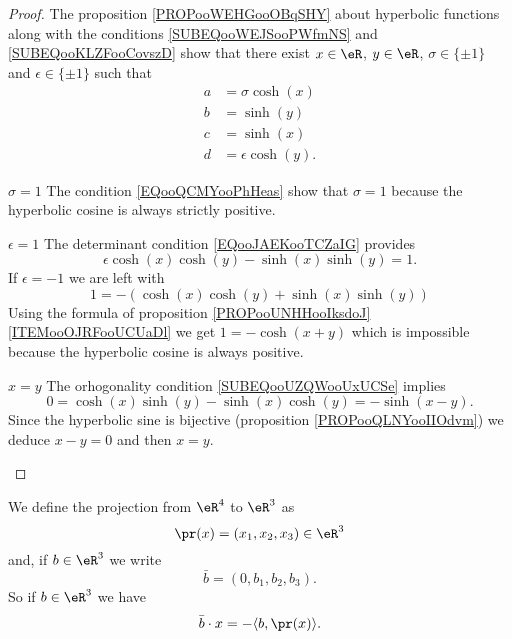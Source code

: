 \begin{proof}
    The proposition \ref{PROPooWEHGooOBqSHY} about hyperbolic functions along with the conditions \eqref{SUBEQooWEJSooPWfmNS} and \ref{SUBEQooKLZFooCovszD} show that there exist \( x\in \eR\), \( y\in \eR\), \( \sigma\in\{ \pm1 \}\) and \( \epsilon\in\{ \pm 1 \}\) such that 
    \begin{subequations}
        \begin{align}
            a&=\sigma\cosh(x)\\
            b&=\sinh(y)\\
            c&=\sinh(x)\\
            d&=\epsilon\cosh(y).
        \end{align}
    \end{subequations}

    \begin{subproof}
        \item[\( \sigma=1\)]
    The condition \eqref{EQooQCMYooPhHeas} show that \( \sigma=1\) because the hyperbolic cosine is always strictly positive.

        \item[\( \epsilon=1\)]
            The determinant condition \eqref{EQooJAEKooTCZaIG} provides
            \begin{equation}
                \epsilon\cosh(x)\cosh(y)-\sinh(x)\sinh(y)=1.
            \end{equation}
            If \( \epsilon=-1\) we are left with
            \begin{equation}
                1=-(\cosh(x)\cosh(y)+\sinh(x)\sinh(y))
            \end{equation}
            Using the formula of proposition \ref{PROPooUNHHooIksdoJ}\ref{ITEMooOJRFooUCUaDl} we get $1=-\cosh(x+y)$ which is impossible because the hyperbolic cosine is always positive.
        \item[\( x=y\)]
            The orhogonality condition \eqref{SUBEQooUZQWooUxUCSe} implies
            \begin{equation}
                0=\cosh(x)\sinh(y)-\sinh(x)\cosh(y)=-\sinh(x-y).
            \end{equation}
            Since the hyperbolic sine is bijective (proposition \ref{PROPooQLNYooIIOdvm}) we deduce \( x-y=0\) and then \( x=y\).
    \end{subproof}
\end{proof}

We define the projection from \( \eR^4\) to \( \eR^3\) as
\begin{equation}
    \pr(x)=(x_1,x_2,x_3)\in \eR^3
\end{equation}
and, if \( b\in \eR^3\) we write
\begin{equation}
    \bar b=(0,b_1,b_2,b_3).
\end{equation}
So if \( b\in \eR^3\) we have
\begin{equation}        \label{EQooOIBWooAvxfYz}
    \bar b\cdot x=-\langle b, \pr(x)\rangle .
\end{equation}


